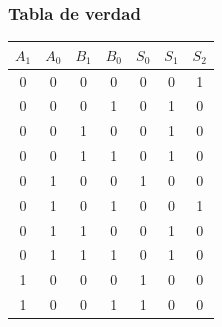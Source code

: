 \subsubsection{Tabla de verdad}
\begin{center}
\begin{tabular}{|cccc|ccc|}
\hline
\rowcolor[HTML]{FFCCC9} 
\textbf{$A_1$} & \textbf{$A_0$} & \textbf{$B_1$} & \multicolumn{1}{l|}{\cellcolor[HTML]{FFCCC9}\textbf{$B_0$}} & \textbf{$S_0$} & \textbf{$S_1$} & \textbf{$S_2$} \\ \hline
0              & 0              & 0              & 0                                                           & 0              & 0              & 1              \\
0              & 0              & 0              & 1                                                           & 0              & 1              & 0              \\
0              & 0              & 1              & 0                                                           & 0              & 1              & 0              \\
0              & 0              & 1              & 1                                                           & 0              & 1              & 0              \\
0              & 1              & 0              & 0                                                           & 1              & 0              & 0              \\
0              & 1              & 0              & 1                                                           & 0              & 0              & 1              \\
0              & 1              & 1              & 0                                                           & 0              & 1              & 0              \\
0              & 1              & 1              & 1                                                           & 0              & 1              & 0              \\
1              & 0              & 0              & 0                                                           & 1              & 0              & 0              \\
1              & 0              & 0              & 1                                                           & 1              & 0              & 0              \\

\end{tabular}
\end{center}
